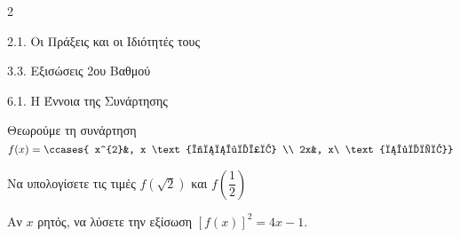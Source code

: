 \begin{ylh}{2}
    \item 2.1. Οι Πράξεις και οι Ιδιότητές τους
    \item 3.3. Εξισώσεις 2ου Βαθμού
    \item 6.1. Η Έννοια της Συνάρτησης
\end{ylh}
Θεωρούμε τη συνάρτηση \(f(x) = \ccases{
x^{2}&, x \text{άρρητος} \\
2x&, x\ \text{ρητός}} \)
\begin{alist}
\item Να υπολογίσετε τις τιμές $f\left( \sqrt{2} \right)$ και $f\left( \dfrac{1}{2} \right)$
\item Αν $x$ ρητός, να λύσετε την εξίσωση $\left\lbrack f(x) \right\rbrack^{2} = 4x - 1$.
\end{alist}

